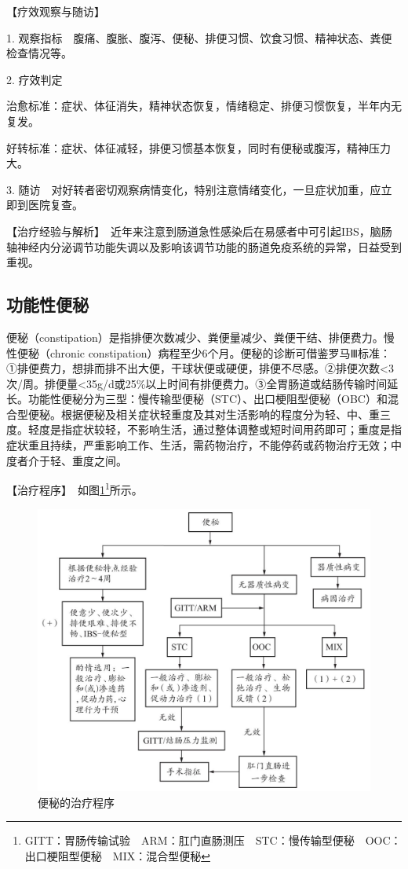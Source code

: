 【疗效观察与随访】

1.
观察指标　腹痛、腹胀、腹泻、便秘、排便习惯、饮食习惯、精神状态、粪便检查情况等。

2. 疗效判定

治愈标准：症状、体征消失，精神状态恢复，情绪稳定、排便习惯恢复，半年内无复发。

好转标准：症状、体征减轻，排便习惯基本恢复，同时有便秘或腹泻，精神压力大。

3.
随访　对好转者密切观察病情变化，特别注意情绪变化，一旦症状加重，应立即到医院复查。

【治疗经验与解析】　近年来注意到肠道急性感染后在易感者中可引起IBS，脑肠轴神经内分泌调节功能失调以及影响该调节功能的肠道免疫系统的异常，日益受到重视。

\subsection{功能性便秘}

便秘（constipation）是指排便次数减少、粪便量减少、粪便干结、排便费力。慢性便秘（chronic
constipation）病程至少6个月。便秘的诊断可借鉴罗马Ⅲ标准：①排便费力，想排而排不出大便，干球状便或硬便，排便不尽感。②排便次数\textless{}3次/周。排便量\textless{}35g/d或25\%以上时间有排便费力。③全胃肠道或结肠传输时间延长。功能性便秘分为三型：慢传输型便秘（STC）、出口梗阻型便秘（OBC）和混合型便秘。根据便秘及相关症状轻重度及其对生活影响的程度分为轻、中、重三度。轻度是指症状较轻，不影响生活，通过整体调整或短时间用药即可；重度是指症状重且持续，严重影响工作、生活，需药物治疗，不能停药或药物治疗无效；中度者介于轻、重度之间。

【治疗程序】　如图\ref{fig3-8-2}\footnote{GITT：胃肠传输试验　ARM：肛门直肠测压　STC：慢传输型便秘　OOC：出口梗阻型便秘　MIX：混合型便秘}所示。

\begin{figure}[!htbp]
 \centering
 \includegraphics{./images/Image00096.jpg}
 \captionsetup{justification=centering}
 \caption{便秘的治疗程序}
 \label{fig3-8-2}
  \end{figure} 


